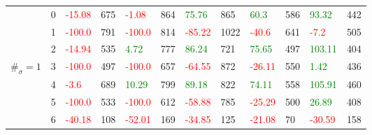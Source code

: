 \begin{table}[!htb]
\begin{adjustwidth}{-0.8in}{-0.9in}
\begin{tabular}{|p{4em}|p{2em}|p{3em}|p{3em}|p{3em}|p{3em}|p{3em}|p{3em}|p{3em}|p{3em}|p{3em}|p{3em}|}
            & 0 & \textcolor{red}{-15.08} & 675 & \textcolor{red}{-1.08} & 864 & \textcolor{green}{75.76} & 865 & \textcolor{green}{60.3} & 586 & \textcolor{green}{93.32} & 442\\\cline{3-12}
            & 1 & \textcolor{red}{-100.0} & 791 & \textcolor{red}{-100.0} & 814 & \textcolor{red}{-85.22} & 1022 & \textcolor{red}{-40.6} & 641 & \textcolor{red}{-7.2} & 505\\\cline{3-12}
            & 2 & \textcolor{red}{-14.94} & 535 & \textcolor{green}{4.72} & 777 & \textcolor{green}{86.24} & 721 & \textcolor{green}{75.65} & 497 & \textcolor{green}{103.11} & 404\\\cline{3-12}
            $\#_{\sigma}=1$ & 3 & \textcolor{red}{-100.0} & 497 & \textcolor{red}{-100.0} & 657 & \textcolor{red}{-64.55} & 872 & \textcolor{red}{-26.11} & 550 & \textcolor{green}{1.42} & 436\\\cline{3-12}
            & 4 & \textcolor{red}{-3.6} & 689 & \textcolor{green}{10.29} & 799 & \textcolor{green}{89.18} & 822 & \textcolor{green}{74.11} & 558 & \textcolor{green}{105.91} & 460\\\cline{3-12}
            & 5 & \textcolor{red}{-100.0} & 533 & \textcolor{red}{-100.0} & 612 & \textcolor{red}{-58.88} & 785 & \textcolor{red}{-25.29} & 500 & \textcolor{green}{26.89} & 408\\\cline{3-12}
            & 6 & \textcolor{red}{-40.18} & 108 & \textcolor{red}{-52.01} & 169 & \textcolor{red}{-34.85} & 125 & \textcolor{red}{-21.08} & 70 & \textcolor{red}{-30.59} & 158\\\hline\hline
            

\end{tabular}
\end{adjustwidth}
\end{table}
